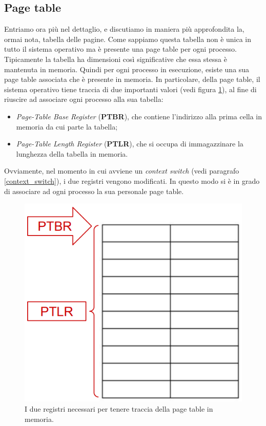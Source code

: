 % 
\subsection{Page table}\label{page_table}
Entriamo ora più nel dettaglio, e discutiamo in maniera più approfondita la, ormai nota, tabella delle pagine. Come sappiamo questa tabella non è unica in tutto il sistema operativo ma è presente una page table per ogni processo. Tipicamente la tabella ha dimensioni così significative che essa stessa è mantenuta in memoria. Quindi per ogni processo in esecuzione, esiste una sua page table associata che è presente in memoria. In particolare, della page table, il sistema operativo tiene traccia di due importanti valori (vedi figura \ref{fig:page_table_registers}), al fine di riuscire ad associare ogni processo alla sua tabella:
\vspace{-5px}
\begin{itemize}
\setlength{\itemsep}{-.15 em}
    \item \textit{Page-Table Base Register} (\textbf{PTBR}), che contiene l'indirizzo alla prima cella in memoria da cui parte la tabella;
    \item \textit{Page-Table Length Register} (\textbf{PTLR}), che si occupa di immagazzinare la lunghezza della tabella in memoria. 
\end{itemize}
Ovviamente, nel momento in cui avviene un \textit{context switch} (vedi paragrafo \ref{context_switch}), i due registri vengono modificati. In questo modo si è in grado di associare ad ogni processo la sua personale page table.
\begin{figure}[h]
    \centering
    \includegraphics[width = .3\textwidth]{../res/imgs/main memory/page_table_registers.png}
    \caption{I due registri necessari per tenere traccia della page table in memoria.}
    \label{fig:page_table_registers}
\end{figure}

% 
